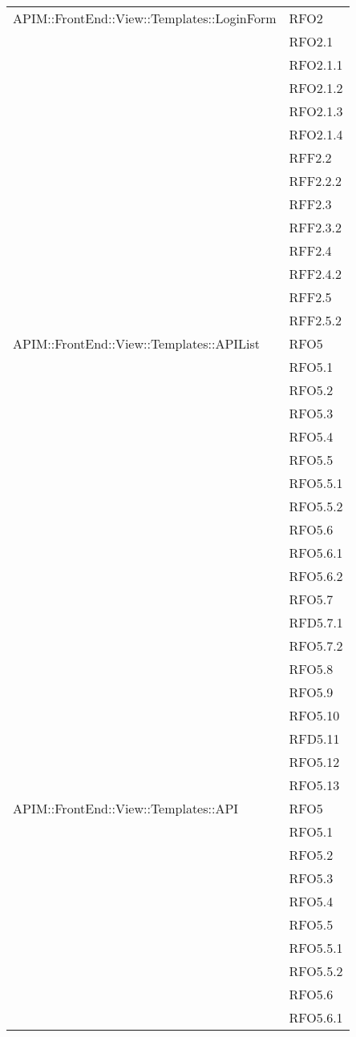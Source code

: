 \begin{longtable}{ p{12cm} | p{4cm} }
		    \hline		    
		    APIM::FrontEnd::View::Templates::LoginForm
		    & RFO2 \\
		    & RFO2.1 \\
		    & RFO2.1.1 \\
		    & RFO2.1.2 \\
		    & RFO2.1.3 \\
		    & RFO2.1.4 \\
		    & RFF2.2 \\
		    & RFF2.2.2 \\
		    & RFF2.3 \\
		    & RFF2.3.2 \\
		    & RFF2.4 \\
		    & RFF2.4.2 \\
		    & RFF2.5 \\
		    & RFF2.5.2 \\	
		    \hline	    
		    APIM::FrontEnd::View::Templates::APIList
		    & RFO5 \\
& RFO5.1 \\
& RFO5.2 \\
& RFO5.3 \\
& RFO5.4 \\
& RFO5.5 \\
& RFO5.5.1 \\
& RFO5.5.2 \\
& RFO5.6\\
& RFO5.6.1 \\
& RFO5.6.2 \\
& RFO5.7 \\
& RFD5.7.1 \\
& RFO5.7.2 \\
& RFO5.8 \\
& RFO5.9 \\
& RFO5.10 \\
& RFD5.11 \\
& RFO5.12 \\
& RFO5.13 \\
		    \hline	
		    APIM::FrontEnd::View::Templates::API
		    & RFO5 \\
& RFO5.1 \\
& RFO5.2 \\
& RFO5.3 \\
& RFO5.4 \\
& RFO5.5 \\
& RFO5.5.1 \\
& RFO5.5.2 \\
& RFO5.6\\
& RFO5.6.1 \\

\end{longtable}
